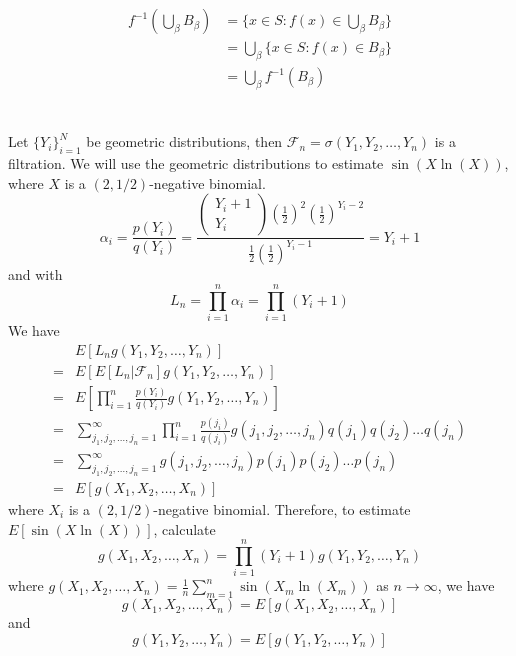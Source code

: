 \documentclass[11pt]{article}
\begin{document}
\subsection{}
\begin{equation*}
    \begin{aligned}
        f^{-1} \left(\bigcup_\beta B_\beta \right) &= \{x \in S: f(x) \in \bigcup_\beta B_\beta \} \\
        &= \bigcup_\beta \{x \in S: f(x) \in B_\beta\} \\
        &= \bigcup_\beta f^{-1}(B_\beta) 
    \end{aligned}
\end{equation*}
\newpage
\section{}
Let $\{Y_i\}_{i=1}^N$ be geometric distributions, then $\mathcal{F}_n = \sigma(Y_1, Y_2, \hdots, Y_n)$ is a filtration. We will use the geometric distributions to estimate $\sin(X \ln(X))$, 
where $X$ is a $(2,1/2)$-negative binomial.  
\[
    \alpha_i = \frac{p(Y_i)}{q(Y_i)} = \frac{\begin{pmatrix} Y_i+1 \\ Y_i \end{pmatrix} \left(\frac{1}{2}\right)^2 \left( \frac{1}{2}\right)^{Y_i-2}}{\frac{1}{2} \left( \frac{1}{2}\right)^{Y_i-1}} = Y_i + 1
\]
and with
\[
    L_n = \prod_{i=1}^n \alpha_i = \prod_{i=1}^n (Y_i + 1)
\]
We have
\begin{equation*}
    \begin{aligned}
        &E[L_n g(Y_1,Y_2, \hdots, Y_n)] \\
        =& E[ E[L_n | \mathcal{F}_n] g(Y_1, Y_2, \hdots, Y_n)] \\
        =& E\left[\prod_{i=1}^n \frac{p(Y_i)}{q(Y_i)} g(Y_1,Y_2, \hdots, Y_n) \right] \\
        =& \sum_{j_1, j_2, \hdots, j_n = 1}^\infty \prod_{i=1}^n \frac{p(j_i)}{q(j_i)} g(j_1, j_2, \hdots, j_n) q(j_1) q(j_2) \hdots q(j_n) \\
        =& \sum_{j_1, j_2, \hdots, j_n = 1}^\infty g(j_1, j_2, \hdots, j_n) p(j_1)p(j_2)\hdots p(j_n) \\
        =& E[g(X_1, X_2, \hdots, X_n)]
    \end{aligned}
\end{equation*}
where $X_i$ is a $(2,1/2)$-negative binomial.
Therefore, to estimate $E[\sin(X\ln(X))]$, calculate
\[
    g(X_1, X_2, \hdots, X_n) = \prod_{i=1}^n (Y_i+1) g(Y_1, Y_2, \hdots, Y_n)
\]
where $g(X_1, X_2, \hdots, X_n) = \frac{1}{n} \sum_{m=1}^n \sin(X_m \ln(X_m))$ as $n \to \infty$, we have
\[
    g(X_1, X_2, \hdots, X_n) = E[g(X_1, X_2, \hdots, X_n)]
\]
and 
\[
    g(Y_1, Y_2, \hdots, Y_n) = E[g(Y_1, Y_2, \hdots, Y_n)]
\]
\end{document}
